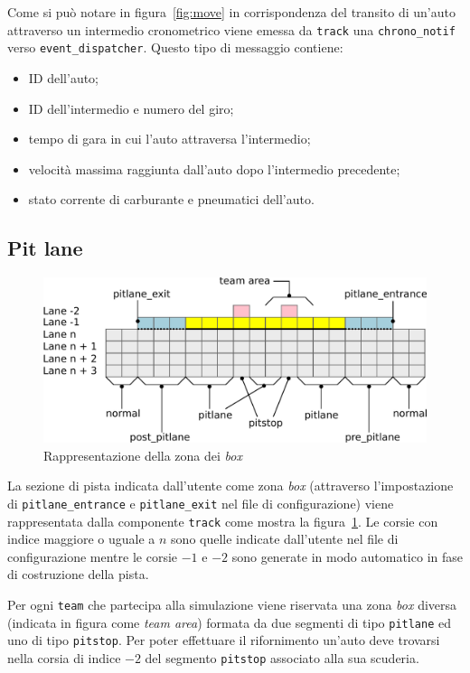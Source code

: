 \documentclass[a4paper]{report}
\begin{document}
Come si può notare in figura~\ref{fig:move} in corrispondenza del transito di un'auto attraverso un intermedio cronometrico viene emessa da \texttt{track} una \texttt{chrono\_notif} verso \texttt{event\_dispatcher}. Questo tipo di messaggio contiene:
\begin{itemize}
\item ID dell'auto;
\item ID dell'intermedio e numero del giro;
\item tempo di gara in cui l'auto attraversa l'intermedio;
\item velocità massima raggiunta dall'auto dopo l'intermedio precedente;
\item stato corrente di carburante e pneumatici dell'auto.
\end{itemize}

\subsection{Pit lane}
\begin{figure}
\includegraphics[width=\textwidth]{diagrammi/PitLane}
\caption{Rappresentazione della zona dei \textit{box}}
\label{fig:pitLane}
\end{figure}

La sezione di pista indicata dall'utente come zona \textit{box} (attraverso l'impostazione di \texttt{pitlane\_entrance} e \texttt{pitlane\_exit} nel file di configurazione) viene rappresentata dalla componente \texttt{track} come mostra la figura~\ref{fig:pitLane}. Le corsie con indice maggiore o uguale a $n$ sono quelle indicate dall'utente nel file di configurazione mentre le corsie $-1$ e $-2$ sono generate in modo automatico in fase di costruzione della pista.

Per ogni \texttt{team} che partecipa alla simulazione viene riservata una zona \textit{box} diversa (indicata in figura come \textit{team area}) formata da due segmenti di tipo \texttt{pitlane} ed uno di tipo \texttt{pitstop}. Per poter effettuare il rifornimento un'auto deve trovarsi nella corsia di indice $-2$ del segmento \texttt{pitstop} associato alla sua scuderia.
\end{document}

